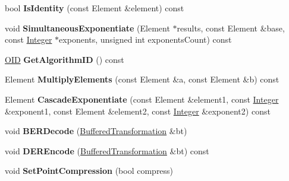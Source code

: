 \begin{DoxyCompactItemize}
\item 
\hypertarget{class_d_l___group_parameters___e_c_a3b5b5ca00a83b0a518efd6cc4c4ad1a0}{
bool {\bfseries IsIdentity} (const Element \&element) const }
\label{class_d_l___group_parameters___e_c_a3b5b5ca00a83b0a518efd6cc4c4ad1a0}

\item 
\hypertarget{class_d_l___group_parameters___e_c_a9ab337ca2b07fec5828426325529a470}{
void {\bfseries SimultaneousExponentiate} (Element $\ast$results, const Element \&base, const \hyperlink{class_integer}{Integer} $\ast$exponents, unsigned int exponentsCount) const }
\label{class_d_l___group_parameters___e_c_a9ab337ca2b07fec5828426325529a470}

\item 
\hypertarget{class_d_l___group_parameters___e_c_adda64af7b30a9afadd136ad813223619}{
\hyperlink{class_o_i_d}{OID} {\bfseries GetAlgorithmID} () const }
\label{class_d_l___group_parameters___e_c_adda64af7b30a9afadd136ad813223619}

\item 
\hypertarget{class_d_l___group_parameters___e_c_a434e7e448bac260189e75437a0170f35}{
Element {\bfseries MultiplyElements} (const Element \&a, const Element \&b) const }
\label{class_d_l___group_parameters___e_c_a434e7e448bac260189e75437a0170f35}

\item 
\hypertarget{class_d_l___group_parameters___e_c_af4f79dc58b72168d5779093176ad4bdd}{
Element {\bfseries CascadeExponentiate} (const Element \&element1, const \hyperlink{class_integer}{Integer} \&exponent1, const Element \&element2, const \hyperlink{class_integer}{Integer} \&exponent2) const }
\label{class_d_l___group_parameters___e_c_af4f79dc58b72168d5779093176ad4bdd}

\item 
\hypertarget{class_d_l___group_parameters___e_c_ad2f42b0fb9ca4761daefe66c7112e358}{
void {\bfseries BERDecode} (\hyperlink{class_buffered_transformation}{BufferedTransformation} \&bt)}
\label{class_d_l___group_parameters___e_c_ad2f42b0fb9ca4761daefe66c7112e358}

\item 
\hypertarget{class_d_l___group_parameters___e_c_a0bcf9859ace1a04a57d233e1b4f058d4}{
void {\bfseries DEREncode} (\hyperlink{class_buffered_transformation}{BufferedTransformation} \&bt) const }
\label{class_d_l___group_parameters___e_c_a0bcf9859ace1a04a57d233e1b4f058d4}

\item 
\hypertarget{class_d_l___group_parameters___e_c_a810ae195d94843707541f306c1a10854}{
void {\bfseries SetPointCompression} (bool compress)}
\label{class_d_l___group_parameters___e_c_a810ae195d94843707541f306c1a10854}


\end{DoxyCompactItemize}
